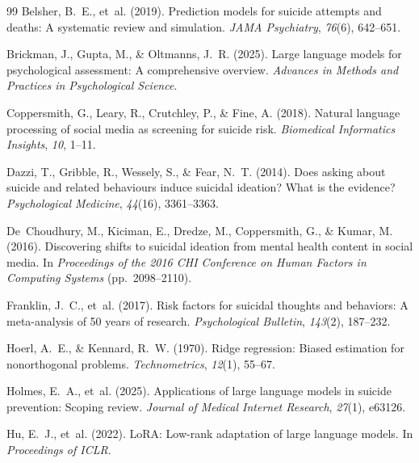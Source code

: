 \documentclass[review,12pt,authoryear]{elsarticle}
\begin{document}
\begin{thebibliography}{99}
Belsher, B.~E., et~al. (2019).
\newblock Prediction models for suicide attempts and deaths: {A} systematic review and simulation.
\newblock \textit{JAMA Psychiatry}, \textit{76}(6), 642--651.

Brickman, J., Gupta, M., \& Oltmanns, J.~R. (2025).
\newblock Large language models for psychological assessment: {A} comprehensive overview.
\newblock \textit{Advances in Methods and Practices in Psychological Science}.

Coppersmith, G., Leary, R., Crutchley, P., \& Fine, A. (2018).
\newblock Natural language processing of social media as screening for suicide risk.
\newblock \textit{Biomedical Informatics Insights}, \textit{10}, 1--11.

Dazzi, T., Gribble, R., Wessely, S., \& Fear, N.~T. (2014).
\newblock Does asking about suicide and related behaviours induce suicidal ideation? {W}hat is the evidence?
\newblock \textit{Psychological Medicine}, \textit{44}(16), 3361--3363.

De~Choudhury, M., Kiciman, E., Dredze, M., Coppersmith, G., \& Kumar, M. (2016).
\newblock Discovering shifts to suicidal ideation from mental health content in social media.
\newblock In \textit{Proceedings of the 2016 CHI Conference on Human Factors in Computing Systems} (pp.\ 2098--2110).

Franklin, J.~C., et~al. (2017).
\newblock Risk factors for suicidal thoughts and behaviors: {A} meta-analysis of 50 years of research.
\newblock \textit{Psychological Bulletin}, \textit{143}(2), 187--232.

Hoerl, A.~E., \& Kennard, R.~W. (1970).
\newblock Ridge regression: {B}iased estimation for nonorthogonal problems.
\newblock \textit{Technometrics}, \textit{12}(1), 55--67.

Holmes, E.~A., et~al. (2025).
\newblock Applications of large language models in suicide prevention: {S}coping review.
\newblock \textit{Journal of Medical Internet Research}, \textit{27}(1), e63126.

Hu, E.~J., et~al. (2022).
\newblock Lo{RA}: {L}ow-rank adaptation of large language models.
\newblock In \textit{Proceedings of ICLR}.


\end{thebibliography}
\end{document}
